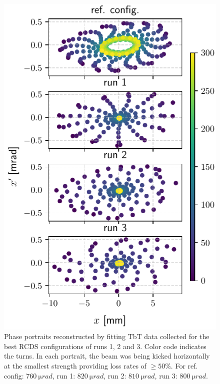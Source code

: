 \documentclass[a4paper,
               keeplastbox,   %
               ]{jacow}
\begin{document}
\begin{figure}[!h]
    \centering
    \includegraphics[width=\columnwidth]{old_tunes_phase.pdf}
    \caption{Phase portraits reconstructed by fitting TbT data collected for the best RCDS configurations of runs 1, 2 and 3. Color code indicates the turns. In each portrait, the beam was being kicked horizontally at the smallest strength providing loss rates of $\geq 50\%$. For ref. config: $760~\unit{\micro rad}$, run 1: $820~\unit{\micro rad}$, run 2: $810~\unit{\micro rad}$, run 3: $800~\unit{\micro rad}$.}
    \label{fig:oldtunes_phase}
\end{figure}
\end{document}
